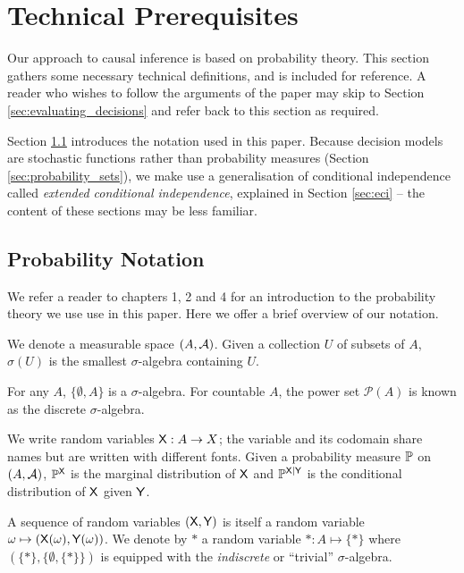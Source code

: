 
\section{Technical Prerequisites}\label{sec:tech_prereq}

Our approach to causal inference is based on probability theory. This section gathers some necessary technical definitions, and is included for reference. A reader who wishes to follow the arguments of the paper may skip to Section \ref{sec:evaluating_decisions} and refer back to this section as required.

Section \ref{sec:standard_prob} introduces the notation used in this paper. Because decision models are stochastic functions rather than probability measures (Section \ref{sec:probability_sets}), we make use a generalisation of conditional independence called \emph{extended conditional independence}, explained in Section \ref{sec:eci} -- the content of these sections may be less familiar.


\subsection{Probability Notation}\label{sec:standard_prob}

We refer a reader to \citet{cinlar_probability_2011} chapters 1, 2 and 4 for an introduction to the probability theory we use use in this paper. Here we offer a brief overview of our notation.

We denote a measurable space $(A, \mathcal{A})$. Given a collection $U$ of subsets of $A$, $\sigma(U)$ is the smallest $\sigma$-algebra containing $U$.

For any $A$, $\{\emptyset,A\}$ is a $\sigma$-algebra. For countable $A$, the power set $\mathscr{P}(A)$ is known as the discrete $\sigma$-algebra.

We write random variables $\mathsf{X}:A\to X$; the variable and its codomain share names but are written with different fonts. Given a probability measure $\mathbb{P}$ on $(A,\mathcal{A})$, $\mathbb{P}^{\mathsf{X}}$ is the marginal distribution of $\mathsf{X}$ and $\mathbb{P}^{\mathsf{X}|\mathsf{Y}}$ is the conditional distribution of $\mathsf{X}$ given $\mathsf{Y}$.

A sequence of random variables $(\mathsf{X},\mathsf{Y})$ is itself a random variable $\omega\mapsto (\mathsf{X}(\omega), \mathsf{Y}(\omega))$. We denote by $*$ a random variable $*:A\mapsto \{*\}$ where $(\{*\}, \{\emptyset, \{*\}\})$ is equipped with the \emph{indiscrete} or ``trivial'' $\sigma$-algebra.

